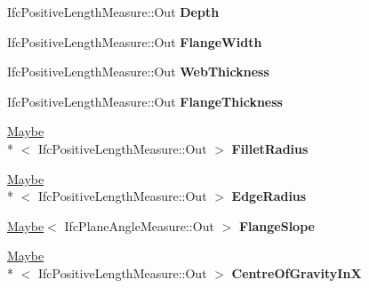 \begin{DoxyCompactItemize}
\item 
\hypertarget{struct_assimp_1_1_i_f_c_1_1_ifc_u_shape_profile_def_ad299659d57e7d88b91b076d626239f86}{Ifc\+Positive\+Length\+Measure\+::\+Out {\bfseries Depth}}\label{struct_assimp_1_1_i_f_c_1_1_ifc_u_shape_profile_def_ad299659d57e7d88b91b076d626239f86}

\item 
\hypertarget{struct_assimp_1_1_i_f_c_1_1_ifc_u_shape_profile_def_ade31e88db1d845f9d6110c984a0c7c06}{Ifc\+Positive\+Length\+Measure\+::\+Out {\bfseries Flange\+Width}}\label{struct_assimp_1_1_i_f_c_1_1_ifc_u_shape_profile_def_ade31e88db1d845f9d6110c984a0c7c06}

\item 
\hypertarget{struct_assimp_1_1_i_f_c_1_1_ifc_u_shape_profile_def_a7f472f1256848f8b498f10a9121c34c3}{Ifc\+Positive\+Length\+Measure\+::\+Out {\bfseries Web\+Thickness}}\label{struct_assimp_1_1_i_f_c_1_1_ifc_u_shape_profile_def_a7f472f1256848f8b498f10a9121c34c3}

\item 
\hypertarget{struct_assimp_1_1_i_f_c_1_1_ifc_u_shape_profile_def_a804023e46ac2661d4adf8d1620d39ae0}{Ifc\+Positive\+Length\+Measure\+::\+Out {\bfseries Flange\+Thickness}}\label{struct_assimp_1_1_i_f_c_1_1_ifc_u_shape_profile_def_a804023e46ac2661d4adf8d1620d39ae0}

\item 
\hypertarget{struct_assimp_1_1_i_f_c_1_1_ifc_u_shape_profile_def_aa4d01ae1b9d5b0ccdb89827424f8e2aa}{\hyperlink{struct_assimp_1_1_s_t_e_p_1_1_maybe}{Maybe}\\*
$<$ Ifc\+Positive\+Length\+Measure\+::\+Out $>$ {\bfseries Fillet\+Radius}}\label{struct_assimp_1_1_i_f_c_1_1_ifc_u_shape_profile_def_aa4d01ae1b9d5b0ccdb89827424f8e2aa}

\item 
\hypertarget{struct_assimp_1_1_i_f_c_1_1_ifc_u_shape_profile_def_a756909f7478d7686e8a43f085f80ec17}{\hyperlink{struct_assimp_1_1_s_t_e_p_1_1_maybe}{Maybe}\\*
$<$ Ifc\+Positive\+Length\+Measure\+::\+Out $>$ {\bfseries Edge\+Radius}}\label{struct_assimp_1_1_i_f_c_1_1_ifc_u_shape_profile_def_a756909f7478d7686e8a43f085f80ec17}

\item 
\hypertarget{struct_assimp_1_1_i_f_c_1_1_ifc_u_shape_profile_def_a9cdfa44437d988d2e3e8f153015dc1a8}{\hyperlink{struct_assimp_1_1_s_t_e_p_1_1_maybe}{Maybe}$<$ Ifc\+Plane\+Angle\+Measure\+::\+Out $>$ {\bfseries Flange\+Slope}}\label{struct_assimp_1_1_i_f_c_1_1_ifc_u_shape_profile_def_a9cdfa44437d988d2e3e8f153015dc1a8}

\item 
\hypertarget{struct_assimp_1_1_i_f_c_1_1_ifc_u_shape_profile_def_a2a3840dcdb388588eb0cdeeb5334804c}{\hyperlink{struct_assimp_1_1_s_t_e_p_1_1_maybe}{Maybe}\\*
$<$ Ifc\+Positive\+Length\+Measure\+::\+Out $>$ {\bfseries Centre\+Of\+Gravity\+In\+X}}\label{struct_assimp_1_1_i_f_c_1_1_ifc_u_shape_profile_def_a2a3840dcdb388588eb0cdeeb5334804c}

\end{DoxyCompactItemize}
